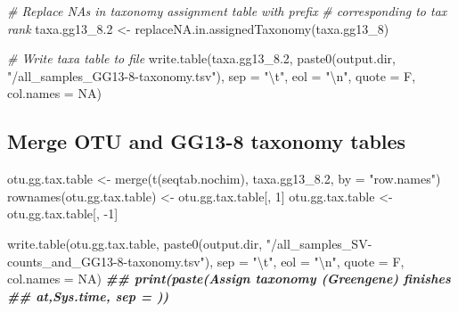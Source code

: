 \documentclass[
]{article}
\newenvironment{Shaded}{\begin{snugshade}}{\end{snugshade}}
\newcommand{\AttributeTok}[1]{\textcolor[rgb]{0.77,0.63,0.00}{#1}}
\newcommand{\CommentTok}[1]{\textcolor[rgb]{0.56,0.35,0.01}{\textit{#1}}}
\newcommand{\ConstantTok}[1]{\textcolor[rgb]{0.00,0.00,0.00}{#1}}
\newcommand{\DecValTok}[1]{\textcolor[rgb]{0.00,0.00,0.81}{#1}}
\newcommand{\DocumentationTok}[1]{\textcolor[rgb]{0.56,0.35,0.01}{\textbf{\textit{#1}}}}
\newcommand{\FloatTok}[1]{\textcolor[rgb]{0.00,0.00,0.81}{#1}}
\newcommand{\FunctionTok}[1]{\textcolor[rgb]{0.00,0.00,0.00}{#1}}
\newcommand{\NormalTok}[1]{#1}
\newcommand{\OtherTok}[1]{\textcolor[rgb]{0.56,0.35,0.01}{#1}}
\newcommand{\SpecialCharTok}[1]{\textcolor[rgb]{0.00,0.00,0.00}{#1}}
\newcommand{\StringTok}[1]{\textcolor[rgb]{0.31,0.60,0.02}{#1}}
\begin{document}
\begin{Shaded}
\begin{Highlighting}[]
\CommentTok{\# Replace NAs in taxonomy assignment table with prefix}
\CommentTok{\# corresponding to tax rank}
\NormalTok{taxa.gg13\_8}\FloatTok{.2} \OtherTok{\textless{}{-}} \FunctionTok{replaceNA.in.assignedTaxonomy}\NormalTok{(taxa.gg13\_8)}

\CommentTok{\# Write taxa table to file}
\FunctionTok{write.table}\NormalTok{(taxa.gg13\_8}\FloatTok{.2}\NormalTok{, }\FunctionTok{paste0}\NormalTok{(output.dir, }\StringTok{"/all\_samples\_GG13{-}8{-}taxonomy.tsv"}\NormalTok{), }
    \AttributeTok{sep =} \StringTok{"}\SpecialCharTok{\textbackslash{}t}\StringTok{"}\NormalTok{, }\AttributeTok{eol =} \StringTok{"}\SpecialCharTok{\textbackslash{}n}\StringTok{"}\NormalTok{, }\AttributeTok{quote =}\NormalTok{ F, }\AttributeTok{col.names =} \ConstantTok{NA}\NormalTok{)}
\end{Highlighting}
\end{Shaded}

\hypertarget{merge-otu-and-gg13-8-taxonomy-tables}{%
\subsection{Merge OTU and GG13-8 taxonomy
tables}\label{merge-otu-and-gg13-8-taxonomy-tables}}

\begin{Shaded}
\begin{Highlighting}[]
\NormalTok{otu.gg.tax.table }\OtherTok{\textless{}{-}} \FunctionTok{merge}\NormalTok{(}\FunctionTok{t}\NormalTok{(seqtab.nochim), taxa.gg13\_8}\FloatTok{.2}\NormalTok{, }\AttributeTok{by =} \StringTok{"row.names"}\NormalTok{)}
\FunctionTok{rownames}\NormalTok{(otu.gg.tax.table) }\OtherTok{\textless{}{-}}\NormalTok{ otu.gg.tax.table[, }\DecValTok{1}\NormalTok{]}
\NormalTok{otu.gg.tax.table }\OtherTok{\textless{}{-}}\NormalTok{ otu.gg.tax.table[, }\SpecialCharTok{{-}}\DecValTok{1}\NormalTok{]}

\FunctionTok{write.table}\NormalTok{(otu.gg.tax.table, }\FunctionTok{paste0}\NormalTok{(output.dir, }\StringTok{"/all\_samples\_SV{-}counts\_and\_GG13{-}8{-}taxonomy.tsv"}\NormalTok{), }
    \AttributeTok{sep =} \StringTok{"}\SpecialCharTok{\textbackslash{}t}\StringTok{"}\NormalTok{, }\AttributeTok{eol =} \StringTok{"}\SpecialCharTok{\textbackslash{}n}\StringTok{"}\NormalTok{, }\AttributeTok{quote =}\NormalTok{ F, }\AttributeTok{col.names =} \ConstantTok{NA}\NormalTok{)}
\DocumentationTok{\#\# print(paste(\textquotesingle{}Assign taxonomy (Greengene) finishes}
\DocumentationTok{\#\# at\textquotesingle{},Sys.time, sep = \textquotesingle{} \textquotesingle{}))}
\end{Highlighting}
\end{Shaded}
\end{document}

